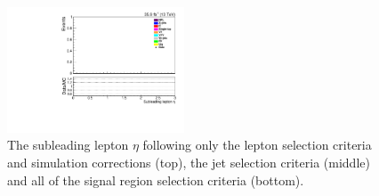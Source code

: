\begin{figure}[h]
\includegraphics[width=0.47\textwidth]{figs/background-estimation/plots/unblinded/prompt_mumu_ttbarInc/lep2Eta_NPL_mumu_wMass_mumu.pdf}
\caption{
The subleading lepton $\eta$ following only the lepton selection criteria and simulation corrections (top), the jet selection criteria (middle) and all of the signal region selection criteria (bottom).
}
\label{fig:SR_lep2Eta}
\end{figure}

